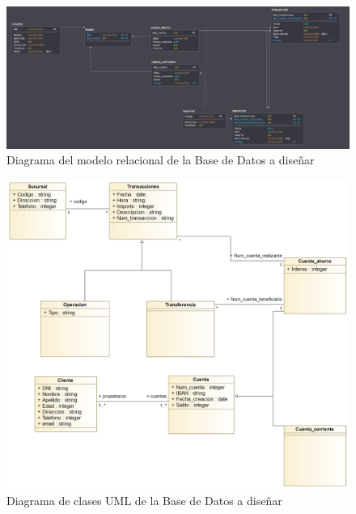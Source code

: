 \documentclass{article}
\begin{document}
\begin{figure}[h!]
	\centering
		\includegraphics[scale=0.6]{images/diagramaRelacional.jpg}
			\caption{Diagrama del modelo relacional de la Base de Datos a diseñar}
			\label{FIG:diagramaRel}
\end{figure}

\begin{figure}[h!]
	\centering
		\includegraphics[scale=0.4]{images/diagramauml.png}
			\caption{Diagrama de clases UML de la Base de Datos a diseñar}
			\label{FIG:diagramaUML}
\end{figure}
\end{document}

